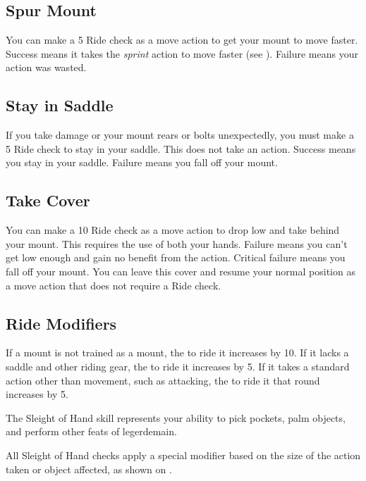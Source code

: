     \subsection{Spur Mount}
        You can make a  5 Ride check as a move action to get your mount to move faster. Success means it takes the \textit{sprint} action to move faster (see ).
        Failure means your action was wasted.

    \subsection{Stay in Saddle}
        If you take damage or your mount rears or bolts unexpectedly, you must make a  5 Ride check to stay in your saddle. This does not take an action. Success means you stay in your saddle. Failure means you fall off your mount.

    \subsection{Take Cover}
        You can make a  10 Ride check as a move action to drop low and take  behind your mount. This requires the use of both your hands. Failure means you can't get low enough and gain no benefit from the action. Critical failure means you fall off your mount. You can leave this cover and resume your normal position as a move action that does not require a Ride check.

    \subsection{Ride Modifiers}\label{Ride Modifiers}
        If a mount is not trained as a mount, the  to ride it increases by 10.
        If it lacks a saddle and other riding gear, the  to ride it increases by 5. If it takes a standard action other than movement, such as attacking, the  to ride it that round increases by 5.

\newpage
{}

        The Sleight of Hand skill represents your ability to pick pockets, palm objects, and perform other feats of legerdemain.

        All Sleight of Hand checks apply a special modifier based on the size of the action taken or object affected, as shown on .

